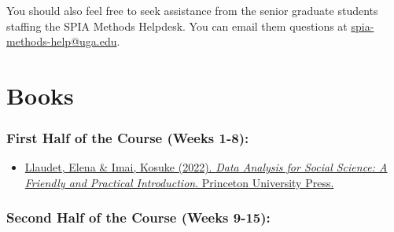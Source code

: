 \documentclass[11pt, letterpaper]{article}
\begin{document}
You should also feel free to seek assistance from the senior graduate students staffing the SPIA Methods Helpdesk. You can email them questions at \href{mailto:spia-methods-help@uga.edu}{spia-methods-help@uga.edu}.


\section*{Books}

\subsubsection*{First Half of the Course (Weeks 1-8):}

\begin{itemize}


\item \href{https://press.princeton.edu/books/paperback/9780691199436/data-analysis-for-social-science}{Llaudet, Elena \& Imai, Kosuke (2022). \textit{Data Analysis for Social Science: A Friendly and Practical Introduction}. Princeton University Press.}

\end{itemize}

\subsubsection*{Second Half of the Course (Weeks 9-15):}
\end{document}
